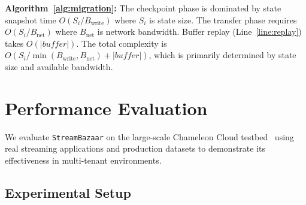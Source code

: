 \documentclass[lettersize,journal]{IEEEtran}
\begin{document}
\textbf{Algorithm~\ref{alg:migration}:} The checkpoint phase is dominated by state snapshot time $O(S_i/B_{\text{write}})$ where $S_i$ is state size. The transfer phase requires $O(S_i/B_{\text{net}})$ where $B_{\text{net}}$ is network bandwidth. Buffer replay (Line~\ref{line:replay}) takes $O(|buffer|)$. The total complexity is $O(S_i/\min(B_{\text{write}}, B_{\text{net}}) + |buffer|)$, which is primarily determined by state size and available bandwidth.


\section{Performance Evaluation} \label{sec:performance}
We evaluate \texttt{StreamBazaar} on the large-scale Chameleon Cloud testbed~\cite{keahey2020lessons} using real streaming applications and production datasets to demonstrate its effectiveness in multi-tenant environments.

\subsection{Experimental Setup}
\label{subsec:experimental_setup}
\end{document}
